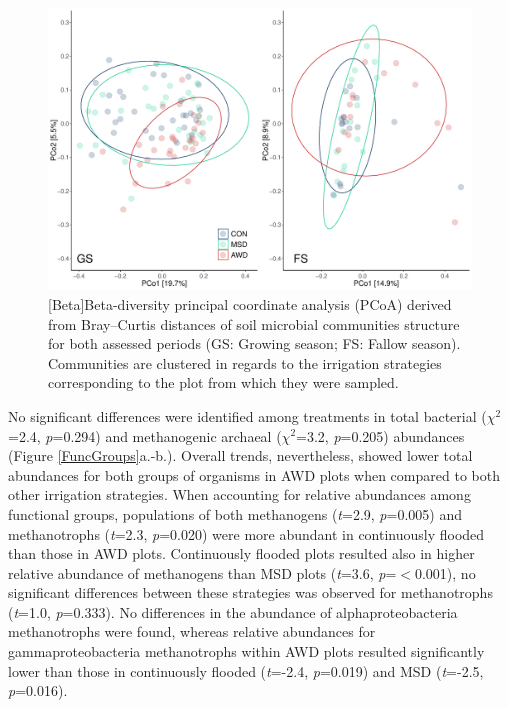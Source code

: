 \begin{figure} [ht]
\captionsetup{justification=justified}
	\centering 
	\includegraphics[scale=0.4, center]{Figures/Chapter_2/PCoA_stages_treatGSFS.pdf}
	[Beta]{Beta-diversity principal coordinate analysis (PCoA) derived from Bray–Curtis distances of soil microbial communities structure for both assessed periods (GS: Growing season; FS: Fallow season). Communities are clustered in regards to the irrigation strategies corresponding to the plot from which they were sampled.}  	
 \label{Beta}
\end{figure}

No significant differences were identified among treatments in total bacterial ($\chi^2$=2.4, \textit{p}=0.294) and methanogenic archaeal ($\chi^2$=3.2, \textit{p}=0.205) abundances (Figure \ref{FuncGroups}a.-b.). Overall trends, nevertheless, showed lower total abundances for both groups of organisms in AWD plots when compared to both other irrigation strategies. When accounting for relative abundances among functional groups, populations of both methanogens (\textit{t}=2.9, \textit{p}=0.005) and methanotrophs (\textit{t}=2.3, \textit{p}=0.020) were more abundant in continuously flooded than those in AWD plots. Continuously flooded plots resulted also in higher relative abundance of methanogens than MSD plots (\textit{t}=3.6, \textit{p}=$<$0.001), no significant differences between these strategies was observed for methanotrophs (\textit{t}=1.0, \textit{p}=0.333). No differences in the abundance of alphaproteobacteria methanotrophs were found, whereas relative abundances for gammaproteobacteria methanotrophs within AWD plots resulted significantly lower than those in continuously flooded (\textit{t}=-2.4, \textit{p}=0.019) and MSD (\textit{t}=-2.5, \textit{p}=0.016). \\

